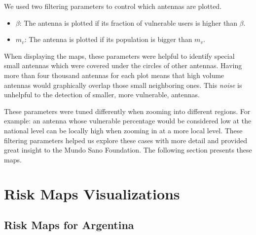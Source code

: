 %

We used two filtering parameters to control which antennas are plotted.
\begin{itemize}
	\item $\beta$: The antenna is plotted if its fraction of vulnerable users is higher than $\beta$.
	\item $m_v$: The antenna is plotted if its population is bigger than $m_v$.
\end{itemize}

When displaying the maps, these parameters were helpful to identify special small antennas which were covered under the circles of other antennas.
Having more than four thousand antennas for each plot means that high volume antennas would graphically overlap those small neighboring ones.
This \textit{noise} is unhelpful to the detection of smaller, more vulnerable, antennas.

These parameters were tuned differently when zooming into different regions.
For example: an antenna whose vulnerable percentage would be considered low at the national level can be locally high when zooming in at a more local level.
These filtering parameters helped us explore these cases with more detail and provided great insight to the Mundo Sano Foundation.
The following section presents these maps.

\section{Risk Maps Visualizations}\label{section:riskmaps}

\subsection{Risk Maps for Argentina}


